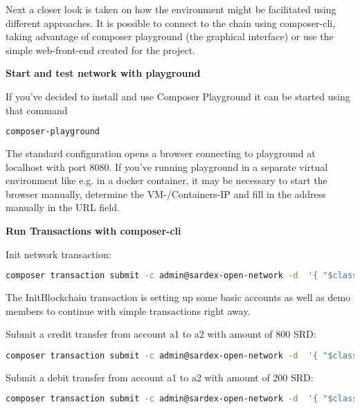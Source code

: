 Next a closer look is taken on how the environment might be facilitated using different approaches. It is possible to connect to the chain using composer-cli, taking advantage of composer playground (the graphical interface) or use the simple web-front-end created for the project.

\textbf{Start and test network with playground}

If you've decided to install and use Composer Playground it can be started using that command

\begin{lstlisting}[language=bash]
	composer-playground
\end{lstlisting}

The standard configuration opens a browser connecting to playground at localhost with port 8080. If you've running playground in a separate virtual environment like e.g. in a docker container, it may be necessary to start the browser manually, determine the VM-/Containers-IP and fill in the address manually in the URL field.


\textbf{Run Transactions with composer-cli}

Init network transaction:

\begin{lstlisting}[language=bash]
	composer transaction submit -c admin@sardex-open-network -d  '{ "$class": "net.sardex.interlace.InitBlockchain" }'
\end{lstlisting}

The InitBlockchain transaction is setting up some basic accounts as well as demo members to continue with simple transactions right away.

Submit a credit transfer from account a1 to a2 with amount of 800 SRD:

\begin{lstlisting}[language=bash]
	composer transaction submit -c admin@sardex-open-network -d  '{ "$class": "net.sardex.interlace.CreditTransfer", "amount": 800, "senderAccount": "resource:net.sardex.interlace.CCAccount#a1", "recipientAccount": "resource:net.sardex.interlace.CCAccount#a2" }'
\end{lstlisting}

Submit a debit transfer from account a1 to a2 with amount of 200 SRD:

\begin{lstlisting}[language=bash]
	composer transaction submit -c admin@sardex-open-network -d  '{ "$class": "net.sardex.interlace.DebitTransfer", "amount": 200, "senderAccount": "resource:net.sardex.interlace.CCAccount#a1", "recipientAccount": "resource:net.sardex.interlace.CCAccount#a2" }'
\end{lstlisting}

